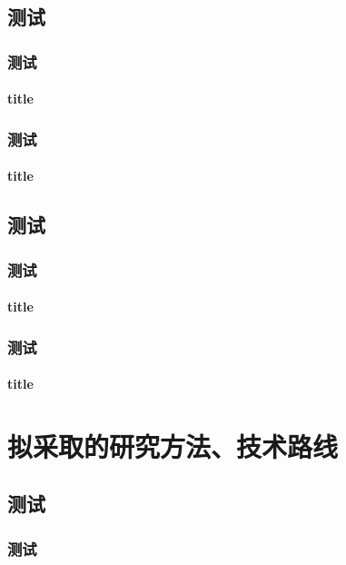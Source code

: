 \documentclass{fdu-doctorplan}
\begin{document}
\section{测试}
\zhlipsum[1-3]
\subsection{测试}
\zhlipsum[1-3]
\subsubsection{title}
\zhlipsum[1-3]

\subsection{测试}
\zhlipsum[1-3]
\subsubsection{title}
\zhlipsum[1-3]

\section{测试}
\zhlipsum[1-3]
\subsection{测试}
\zhlipsum[1-3]
\subsubsection{title}
\zhlipsum[1-3]

\subsection{测试}
\zhlipsum[1-3]
\subsubsection{title}
\zhlipsum[1-3]


\chapter{拟采取的研究方法、技术路线}

\section{测试}
\zhlipsum[1-3]
\subsection{测试}
\zhlipsum[1-3]
\end{document}
